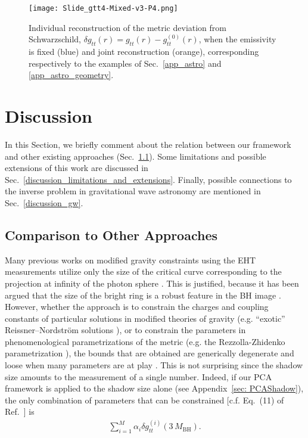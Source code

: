 \documentclass[%
nofootinbib,
 amsmath,amssymb,
 aps,
floatfix,
twocolumn
]{revtex4-2}
\begin{document}
\begin{figure}[]
\centering
\texttt{[image: Slide\_gtt4-Mixed-v3-P4.png]}
\caption{Individual reconstruction of the metric deviation from  Schwarzschild, \(\delta g_{tt} (r) = g^{}_{tt} (r) - g^{(0)}_{tt} (r) \),  when the emissivity is fixed  (blue) and joint reconstruction (orange), corresponding respectively to the examples of Sec.~\ref{app_astro} and \ref{app_astro_geometry}.}
\label{fig_app_4}
\end{figure} 

\section{Discussion}\label{discussion}

In this Section, we briefly comment about the relation between our framework and other existing approaches 
(Sec.~\ref{discussion_comparison}). Some limitations and possible extensions of this work are discussed in Sec.~\ref{discussion_limitations_and_extensions}. Finally, possible connections to the inverse problem in gravitational wave astronomy are mentioned in Sec.~\ref{discussion_gw}. 

\subsection{Comparison to Other Approaches}\label{discussion_comparison}

Many previous works on modified gravity constraints using the EHT measurements utilize only the size of the critical curve corresponding to the projection at infinity of the photon sphere
\cite{Takahashi:2005hy,Johannsen:2010ru,Psaltis:2010ca,Amarilla:2011fx,Loeb:2013lfa,Psaltis:2014mca,Johannsen:2015hib,Psaltis:2015uza,Cunha:2015yba,Cunha:2016wzk,Younsi:2016azx,Psaltis:2018xkc,Cunha:2019dwb,Medeiros:2019cde}. 
This is justified, because it has been argued that the size of the bright ring is a robust feature in the BH image \cite{Akiyama:2019fyp,PhysRevLett.125.141104,Kocherlakota:2021dcv}. 
However, whether the approach is to constrain the charges and coupling constants of particular solutions in modified theories of gravity (e.g. ``exotic'' Reissner–Nordstr\"om solutions \cite{Garfinkle:1990qj, Gibbons:1987ps}), or to constrain the parameters in phenomenological parametrizations of the metric (e.g. the Rezzolla-Zhidenko parametrization \cite{PhysRevD.90.084009}), the bounds that are obtained are generically degenerate and loose when many parameters are at play \cite{Volkel:2020xlc}. 
This is not surprising since the shadow size amounts to the measurement of a single number. 
Indeed, if our PCA framework is applied  to the shadow size alone (see Appendix~\ref{sec: PCAShadow}), the only combination of parameters that can be constrained [c.f. Eq.~(11) of Ref.~\cite{Volkel:2020xlc}] is
\begin{align} \label{eq: PCAShadowEq}
    \sum_{i = 1}^{M} \alpha_i \delta g_{tt}^{(i)} \left(3\, M_\text{BH}\right).
\end{align}
\end{document}
